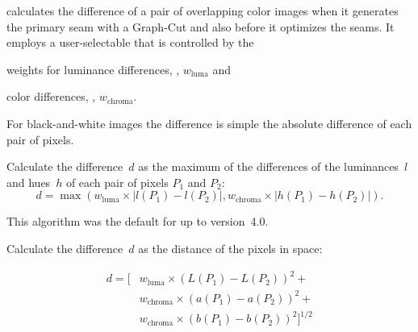 \begin{codelist}
  \App{} calculates the difference of a pair of overlapping color images when it generates the
  primary seam with a Graph-Cut and also before it optimizes the seams.  It employs a
  user-selectable  that is controlled by the

  \begin{compactitemize}
  \item
    weights for luminance differences, ,
    $w_{\mathrm{luma}}$ and

  \item
    color differences, , $w_{\mathrm{chroma}}$.
  \end{compactitemize}

  For black-and-white images the difference is simple the absolute difference of each pair of
  pixels.

  \begin{codelist}
  \item[\itempar{maximum-hue-luminance \\ maximum-hue-lum
      \\ max-hue-luminance \\ max-hue-lum \\ max}]\itemend Calculate
    the difference~$d$ as the maximum of
    the differences of the luminances~$l$ and hues~$h$ of each pair
    of pixels $P_1$ and $P_2$:
    \[
    d  = \max\left(w_{\mathrm{luma}} \times |l(P_1) - l(P_2)|,
    w_{\mathrm{chroma}} \times |h(P_1) - h(P_2)|\right).
    \]

    This algorithm was the default for \App{} up to version~4.0.

  \item[\itempar{delta-e \\ de}]\itemend
    Calculate the difference~$d$ as the  distance of the pixels in
     space:

    \begin{align*}
      d = \Big[ & w_{\mathrm{luma}} \times \left(L(P_1) - L(P_2)\right)^2 + \\
                & w_{\mathrm{chroma}} \times \left(a(P_1) - a(P_2)\right)^2 + \\
                & w_{\mathrm{chroma}} \times \left(b(P_1) - b(P_2)\right)^2
        \Big]^{1/2}
    \end{align*}


\end{codelist}
\end{codelist}
